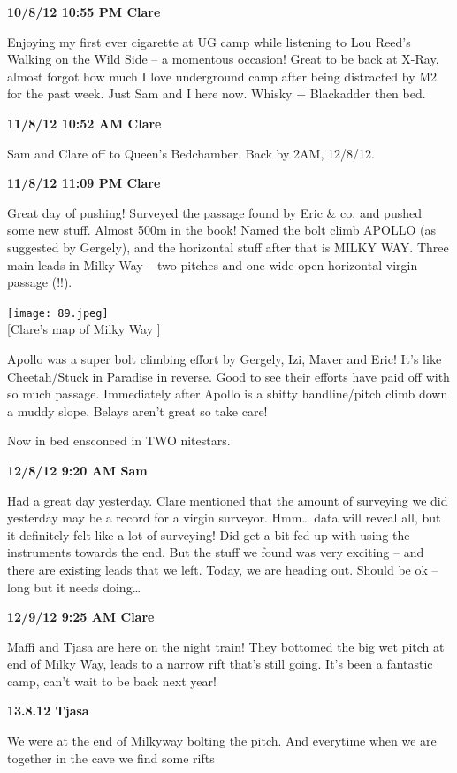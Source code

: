 \textbf{10/8/12 10:55 PM Clare}

Enjoying my first ever cigarette at UG camp while listening to Lou
Reed's Walking on the Wild Side -- a momentous occasion! Great to be
back at X-Ray, almost forgot how much I love underground camp after
being distracted by M2 for the past week. Just Sam and I here now.
Whisky + Blackadder then bed.

\textbf{11/8/12 10:52 AM Clare}

Sam and Clare off to Queen's Bedchamber. Back by 2AM, 12/8/12.

\textbf{11/8/12 11:09 PM Clare}

Great day of pushing! Surveyed the passage found by Eric \& co. and
pushed some new stuff. Almost 500m in the book! Named the bolt climb
APOLLO (as suggested by Gergely), and the horizontal stuff after that is
MILKY WAY. Three main leads in Milky Way -- two pitches and one wide
open horizontal virgin passage (!!).

\texttt{[image: 89.jpeg]}\\
{[}Clare's map of Milky Way {]}

Apollo was a super bolt climbing effort by Gergely, Izi, Maver and Eric!
It's like Cheetah/Stuck in Paradise in reverse. Good to see their
efforts have paid off with so much passage. Immediately after Apollo is
a shitty handline/pitch climb down a muddy slope. Belays aren't great so
take care!

Now in bed ensconced in TWO nitestars.

\textbf{12/8/12 9:20 AM Sam}

Had a great day yesterday. Clare mentioned that the amount of surveying
we did yesterday may be a record for a virgin surveyor. Hmm\ldots{} data
will reveal all, but it definitely felt like a lot of surveying! Did get
a bit fed up with using the instruments towards the end. But the stuff
we found was very exciting -- and there are existing leads that we left.
Today, we are heading out. Should be ok -- long but it needs
doing\ldots{}

\textbf{12/9/12 9:25 AM Clare}

Maffi and Tjasa are here on the night train! They bottomed the big wet
pitch at end of Milky Way, leads to a narrow rift that's still going.
It's been a fantastic camp, can't wait to be back next year!

\textbf{13.8.12 Tjasa}

We were at the end of Milkyway bolting the pitch. And everytime when we
are together in the cave we find some rifts

